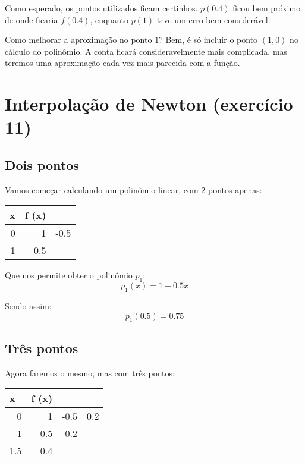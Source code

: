 \documentclass[12pt]{article}
\begin{document}
Como esperado, os pontos utilizados ficam certinhos. \(p(0.4)\) ficou bem próximo de onde ficaria \(f(0.4)\), enquanto \(p(1)\) teve um erro bem considerável.

\medskip

Como melhorar a aproximação no ponto \(1\)? Bem, é só incluir o ponto \((1,0)\) no cálculo do polinômio. A conta ficará consideravelmente mais complicada, mas teremos uma aproximação cada vez mais parecida com a função.

\section{Interpolação de Newton (exercício 11)}

\subsection{Dois pontos}
Vamos começar calculando um polinômio linear, com 2 pontos apenas:

\begin{table}[H]
	\begin{tabular}{@{}rrl@{}}
		\toprule
		\multicolumn{1}{l}{x} & \multicolumn{1}{l}{f (x)} &                          \\ \midrule
		0                     & 1                         & \multicolumn{1}{r}{-0.5} \\
		1                     & 0.5                       &                          \\ \bottomrule
	\end{tabular}
\end{table}

Que nos permite obter o polinômio \(p_1\):
\[
	p_1(x) = 1 - 0.5x
\]

Sendo assim:
\[\boxed{p_1(0.5) = 0.75}\]

\subsection{Três pontos}
Agora faremos o mesmo, mas com três pontos:

\begin{table}[H]
	\begin{tabular}{@{}rrll@{}}
		\toprule
		\multicolumn{1}{l}{x} & \multicolumn{1}{l}{f (x)} &                          &                         \\ \midrule
		0                     & 1                         & \multicolumn{1}{r}{-0.5} & \multicolumn{1}{r}{0.2} \\
		1                     & 0.5                       & \multicolumn{1}{r}{-0.2} &                         \\
		1.5                   & 0.4                       &                          &                         \\ \bottomrule
	\end{tabular}
\end{table}
\end{document}
